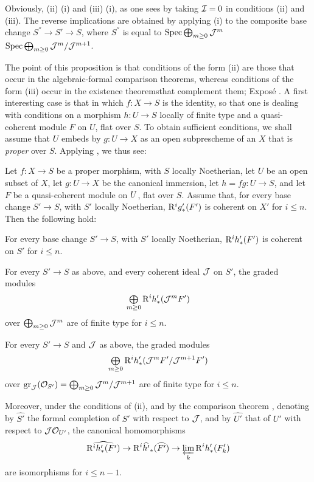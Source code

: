 Obviously, (ii) \ALORS (i) and (iii) \ALORS (i), as one sees by taking $\Ii=0$ in conditions (ii) and (iii). The reverse implications are obtained by applying (i) to the composite base change $S^{''}\to S'\to S$, where $S^{''}$ is equal to $\Spec \sisi{\coprod}{\bigoplus}_{m\geq 0} \Jj^m$ \resp $\Spec \sisi{\coprod}{\bigoplus}_{m\geq 0} \Jj^m/\Jj^{m+1}$.

The point of this proposition is that conditions of the form (ii) are those that occur in the \og algebraic-formal comparison theorems\fg, whereas conditions of the form (iii) occur in the \og existence theorems\fg that complement them; \cf Expos\'e . A first interesting case is that in which $f:X\to S$ is the identity, so that one is dealing with conditions on a morphism $h:U\to S$ locally of finite type and a quasi-coherent module $F$ on $U$, flat over $S$. To obtain sufficient conditions, we shall assume that $U$ embeds by $g:U\to X$ as an open subprescheme of an $X$ that is \emph{proper} over $S$. Applying , we thus see:

\begin{corollaire} \label{XII.5.8}
Let $f:X\to S$ be a proper morphism, with $S$ locally Noetherian, let $U$ be an open subset of $X$, let $g:U\to X$ be the canonical immersion, let $h=fg:U\to S$, and let $F$ be a quasi-coherent module on $\sisi{X}{U}$, flat over $S$. Assume that, for every base change $S'\to S$, with $S'$ locally Noetherian, $\R^ig'_\ast(F')$ is coherent on $X'$ for $i\leq n$. Then the following hold:
\begin{enumeratei}
\item
For every base change $S'\to S$, with $S'$ locally Noetherian, $\R^ih'_\ast(F')$ is coherent on $S'$ for $i\leq n$.
\item
For every $S'\to S$ as above, and every coherent ideal $\Jj$ on $S'$, the graded modules\pageoriginale
\[
\sisi{\coprod}{\tbigoplus}_{m\geq 0} \R^ih'_\ast(\Jj^mF')
\]
over $\sisi{\coprod}{\bigoplus}_{m\geq 0}\Jj^m$ are of finite type for $i\leq n$.
\item
For every $S'\to S$ and $\Jj$ as above, the graded modules
\[
\sisi{\coprod}{\tbigoplus}_{m\geq 0} \R^ih'_\ast(\Jj^mF'/\Jj^{m+1}F')
\]
over $\gr_\Jj(\Oo_{S'})=\sisi{\coprod}{\bigoplus}_{m\geq 0}\Jj^m/\Jj^{m+1}$ are of finite type for $i\leq n$.

Moreover, under the conditions of (ii), and by the comparison theorem , denoting by $\widehat{S'}$ the formal completion of $S'$ with respect to $\Jj$, and by $\widehat{U'}$ that of $U'$ with respect to $\Jj\Oo_{U'}$, the canonical homomorphisms
\[
\widehat{\R^ih'_\ast(F')} \to \R^i\widehat{h'}_\ast(\widehat{F'}) \to \varprojlim_k\R^ih'_\ast(F'_k)
\]
are isomorphisms for $i\leq n-1$.
\end{enumeratei}
\end{corollaire}

